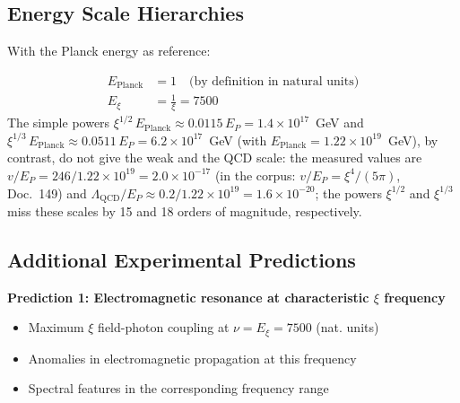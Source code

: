 	\begin{table}[h]
		\centering
		\caption{Dimensional consistency in natural units}
	\end{table}
	
	\subsection{Energy Scale Hierarchies}
	
	With the Planck energy as reference:
	
	\begin{align}
		E_{\text{Planck}} &= 1 \quad \text{(by definition in natural units)} \\
		E_\xi &= \frac{1}{\xi} = 7500
	\end{align}
	The simple powers $\xi^{1/2}\,E_{\text{Planck}} \approx 0.0115\,E_P = 1.4 \times 10^{17}$~GeV and $\xi^{1/3}\,E_{\text{Planck}} \approx 0.0511\,E_P = 6.2 \times 10^{17}$~GeV (with $E_{\text{Planck}} = 1.22 \times 10^{19}$~GeV), by contrast, do not give the weak and the QCD scale: the measured values are $v/E_P = 246/1.22 \times 10^{19} = 2.0 \times 10^{-17}$ (in the corpus: $v/E_P = \xi^4/(5\pi)$, Doc.~149) and $\Lambda_{\text{QCD}}/E_P \approx 0.2/1.22 \times 10^{19} = 1.6 \times 10^{-20}$; the powers $\xi^{1/2}$ and $\xi^{1/3}$ miss these scales by 15 and 18 orders of magnitude, respectively.
	
	\subsection{Additional Experimental Predictions}
	
	\textbf{Prediction 1: Electromagnetic resonance at characteristic $\xi$ frequency}
	\begin{itemize}
		\item Maximum $\xi$ field-photon coupling at $\nu = E_\xi = 7500$ (nat. units)
		\item Anomalies in electromagnetic propagation at this frequency
		\item Spectral features in the corresponding frequency range
	\end{itemize}
	
